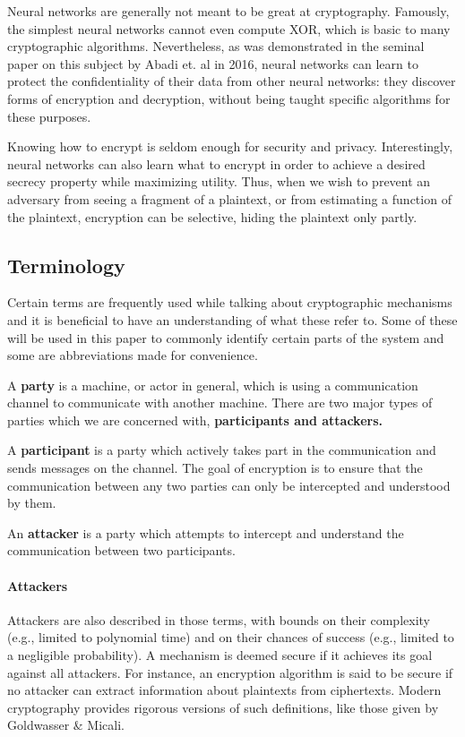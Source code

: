 \documentclass[a4paper]{article}
\begin{document}
  Neural networks are generally not meant to be great at cryptography. Famously, the simplest neural
  networks cannot even compute XOR, which is basic to many cryptographic algorithms. Nevertheless,
  as was demonstrated in the seminal paper on this subject\cite{seminalanc} by Abadi et. al in 2016,
  neural networks can learn to protect the confidentiality of their data from
  other neural networks: they discover forms of encryption and decryption, without being taught 
  specific algorithms for these purposes.

  Knowing how to encrypt is seldom enough for security and privacy. Interestingly, neural networks
  can also learn what to encrypt in order to achieve a desired secrecy property while maximizing
  utility. Thus, when we wish to prevent an adversary from seeing a fragment of a plaintext, or from
  estimating a function of the plaintext, encryption can be selective, hiding the plaintext only partly.

    \subsection{Terminology}
    Certain terms are frequently used while talking about cryptographic mechanisms
    and it is beneficial to have an understanding of what these refer to. Some
    of these will be used in this paper to commonly identify certain parts of the 
    system and some are abbreviations made for convenience.

    A {\bf party} is a machine, or actor in general, which is using a communication
    channel to communicate with another machine. There are two major types of parties
    which we are concerned with, {\bf participants and attackers.}
    
    A {\bf participant} is a party which actively takes part in the communication and
    sends messages on the channel. The goal of encryption is to ensure that the 
    communication between any two parties can only be intercepted and understood 
    by them.

    An {\bf attacker} is a party which attempts to intercept and understand the
    communication between two participants.
  
  \paragraph{Attackers}
  Attackers are also described in those terms, with bounds on their complexity 
  (e.g., limited to polynomial time) and on their chances of success 
  (e.g., limited to a negligible probability). A mechanism is deemed secure if 
  it achieves its goal against all attackers. For instance, an encryption
  algorithm is said to be secure if no attacker can extract information about 
  plaintexts from ciphertexts.
  Modern cryptography provides rigorous versions of such definitions, like those 
  given by Goldwasser \& Micali. \cite{Goldwasser}
  
\end{document}
